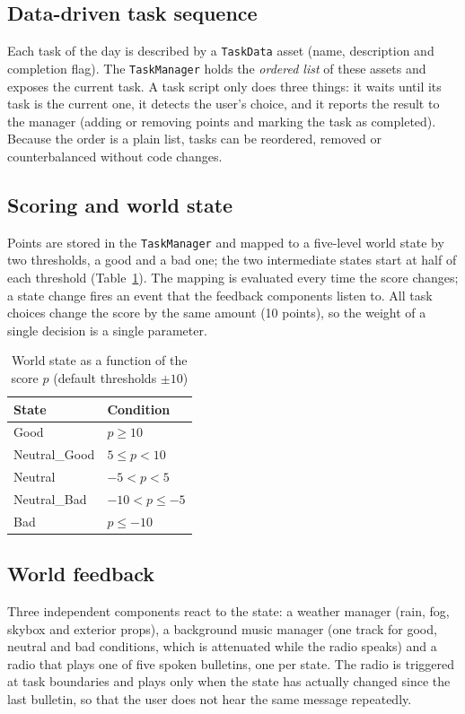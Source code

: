 \documentclass[conference]{IEEEtran}
\begin{document}
\subsection{Data-driven task sequence}
Each task of the day is described by a \texttt{TaskData} asset
(name, description and completion flag). The \texttt{TaskManager} holds the
\emph{ordered list} of these assets and exposes the current task. A task
script only does three things: it waits until its task is the current one,
it detects the user's choice, and it reports the result to the manager
(adding or removing points and marking the task as completed). Because the
order is a plain list, tasks can be reordered, removed or counterbalanced
without code changes.

\subsection{Scoring and world state}
Points are stored in the \texttt{TaskManager} and mapped to a five-level world
state by two thresholds, a good and a bad one; the two intermediate states
start at half of each threshold (Table~\ref{tab:state}). The mapping is evaluated
every time the score changes; a state change fires an event that the feedback
components listen to. All task choices change the score by the same amount
(10 points), so the weight of a single decision is a single parameter.

\begin{table}[htbp]
\caption{World state as a function of the score $p$ (default thresholds $\pm10$)}
\label{tab:state}
\begin{center}
\small
\begin{tabular}{|l|l|}
\hline
\textbf{State} & \textbf{Condition} \\
\hline
Good & $p \ge 10$ \\
Neutral\_Good & $5 \le p < 10$ \\
Neutral & $-5 < p < 5$ \\
Neutral\_Bad & $-10 < p \le -5$ \\
Bad & $p \le -10$ \\
\hline
\end{tabular}
\end{center}
\end{table}

\subsection{World feedback}
Three independent components react to the state: a weather manager (rain,
fog, skybox and exterior props), a background music manager (one track for
good, neutral and bad conditions, which is attenuated while the radio speaks)
and a radio that plays one of five spoken bulletins, one per state. The radio
is triggered at task boundaries and plays only when the state has actually
changed since the last bulletin, so that the user does not hear the same
message repeatedly.
\end{document}
